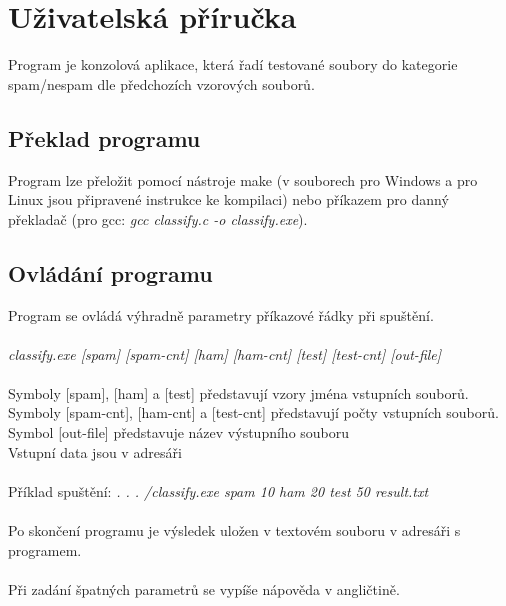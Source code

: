 \documentclass[12pt, a4paper]{report}
\begin{document}


\chapter{Uživatelská příručka}

Program je konzolová aplikace, která řadí testované soubory do kategorie spam/nespam dle předchozích vzorových souborů.

\section{Překlad programu}
Program lze přeložit pomocí nástroje make (v souborech  pro Windows a   pro Linux jsou připravené instrukce ke kompilaci) nebo příkazem pro danný překladač (pro gcc: {\it gcc classify.c -o classify.exe}).


\section{Ovládání programu}
Program se ovládá výhradně parametry příkazové řádky při spuštění.\\
\\
{\it classify.exe [spam] [spam-cnt] [ham] [ham-cnt] [test] [test-cnt] [out-file]}\\
\\
Symboly [spam], [ham] a [test] představují vzory jména vstupních souborů.\\
Symboly [spam-cnt], [ham-cnt] a [test-cnt] představují počty vstupních souborů.\\
Symbol [out-file] představuje název výstupního souboru\\
Vstupní data jsou v adresáři \\
\\
Příklad spuštění: {\it. . . /classify.exe spam 10 ham 20 test 50 result.txt}\\
\\
Po skončení programu je výsledek uložen v textovém souboru  v adresáři s programem.\\
\\
Při zadání špatných parametrů se vypíše nápověda v angličtině.



\end{document}
